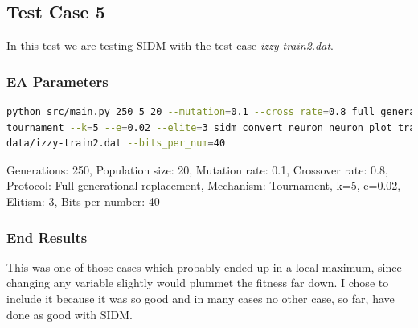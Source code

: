 \subsection{Test Case 5}\label{sec:test-case-5}
In this test we are testing SIDM with the test case
\textit{izzy-train2.dat}.
\subsubsection{EA Parameters}\label{sec:test-case-5-parameters}
\begin{lstlisting}[frame=single, language=bash, caption=Command-line to
replicate the results]
python src/main.py 250 5 20 --mutation=0.1 --cross_rate=0.8 full_generational
tournament --k=5 --e=0.02 --elite=3 sidm convert_neuron neuron_plot training\
data/izzy-train2.dat --bits_per_num=40
\end{lstlisting}
Generations: 250, Population size: 20, Mutation rate: 0.1, Crossover rate: 0.8, Protocol: Full generational replacement, Mechanism: Tournament, k=5, e=0.02, Elitism: 3, Bits per number: 40
\subsubsection{End Results}\label{sec:test-case-5-results}
This was one of those cases which probably ended up in a local maximum, since
changing any variable slightly would plummet the fitness far down. I chose to
include it because it was so good and in many cases no other case, so far, have
done as good with SIDM.

